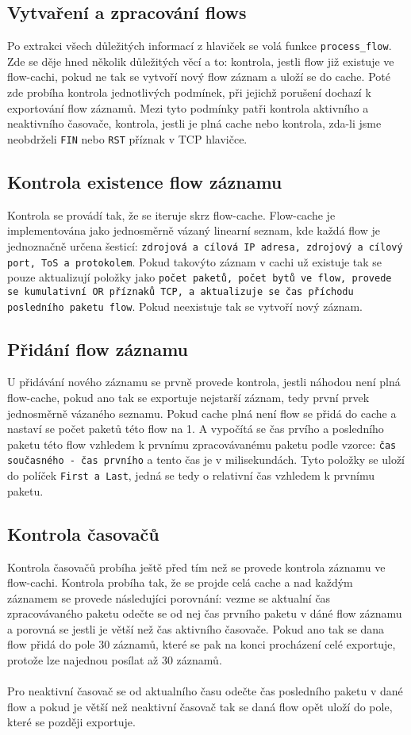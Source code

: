 \documentclass[12pt]{article}
\begin{document}
\subsection{Vytvaření a zpracování flows}
Po extrakci všech důležitých informací z hlaviček se volá funkce \texttt{process\_flow}. Zde se děje hned několik důležitých věcí a to: kontrola, jestli flow již existuje ve flow-cachi, pokud ne tak se vytvoří nový flow záznam a uloží se do cache. Poté zde probíha kontrola
jednotlivých podmínek, při jejichž porušení dochazí k exportování flow záznamů. Mezi tyto podmínky patři kontrola aktivního a neaktivního časovače, kontrola, jestli je plná cache nebo kontrola, zda-li jsme neobdrželi \texttt{FIN} nebo \texttt{RST} příznak v TCP hlavičce.
\subsection*{Kontrola existence flow záznamu}
Kontrola se provádí tak, že se iteruje skrz flow-cache. Flow-cache je implementována jako jednosměrně vázaný linearní seznam, kde každá flow je jednoznačně určena šesticí: \texttt{zdrojová a cílová IP adresa, zdrojový a cílový port, ToS a protokolem}.  
 Pokud takovýto záznam v cachi už existuje tak se pouze aktualizují položky jako \texttt{počet paketů, počet bytů ve flow, provede se kumulativní OR příznaků TCP, a aktualizuje se čas příchodu posledního paketu flow}.
Pokud neexistuje tak se vytvoří nový záznam.

\subsection*{Přidání flow záznamu}
U přidávání nového záznamu se prvně provede kontrola, jestli náhodou není plná flow-cache, pokud ano tak se exportuje nejstarší záznam, tedy první prvek jednosměrně vázaného seznamu.
Pokud cache plná není flow se přidá do cache a nastaví se počet paketů této flow na 1. A vypočítá se čas prvího a posledního paketu této flow vzhledem k prvnímu zpracovávanému paketu podle vzorce: 
\texttt{čas současného - čas prvního} a tento čas je v milisekundách. Tyto položky se uloží do políček \texttt{First a Last}, jedná se tedy o relativní čas vzhledem k prvnímu paketu.
\subsection*{Kontrola časovačů}
Kontrola časovačů probíha ještě před tím než se provede kontrola záznamu ve flow-cachi. Kontrola probíha tak, že se projde celá cache a nad každým záznamem se provede následujíci porovnání: vezme se aktualní čas zpracovávaného paketu odečte se od nej čas prvního paketu v dáné flow záznamu a porovná se jestli je větší než čas aktivního časovače.
Pokud ano tak se dana flow přidá do pole 30 záznamů, které se pak na konci procházení celé exportuje, protože lze najednou posílat až 30 záznamů.
\\\\
Pro neaktivní časovač se od aktualního času odečte čas posledního paketu v dané flow a pokud je větší než neaktivní časovač tak se daná flow opět uloží do pole, které se později exportuje.
\end{document}
